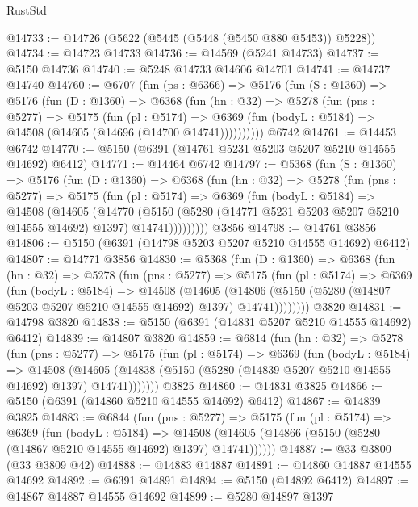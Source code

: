 \begin{lexlean}{RustStd}
\begin{coremodule}
@14733 := @14726 (@5622 (@5445 (@5448 (@5450 @880 @5453)) @5228))
@14734 := @14723 @14733
@14736 := @14569 (@5241 @14733)
@14737 := @5150 @14736
@14740 := @5248 @14733 @14606 @14701
@14741 := @14737 @14740
@14760 := @6707
    (fun (ps : @6366) =>
    @5176
      (fun (S : @1360) =>
      @5176
        (fun (D : @1360) =>
        @6368
          (fun (hn : @32) =>
          @5278
            (fun (pns : @5277) =>
            @5175
              (fun (pl : @5174) =>
              @6369 (fun (bodyL : @5184) => @14508 (@14605 (@14696 (@14700 @14741))))))))))
    @6742
@14761 := @14453 @6742
@14770 := @5150 (@6391 (@14761 @5231 @5203 @5207 @5210 @14555 @14692) @6412)
@14771 := @14464 @6742
@14797 := @5368
    (fun (S : @1360) =>
    @5176
      (fun (D : @1360) =>
      @6368
        (fun (hn : @32) =>
        @5278
          (fun (pns : @5277) =>
          @5175
            (fun (pl : @5174) =>
            @6369
              (fun (bodyL : @5184) =>
              @14508
                (@14605
                  (@14770
                    (@5150
                      (@5280 (@14771 @5231 @5203 @5207 @5210 @14555 @14692) @1397)
                      @14741)))))))))
    @3856
@14798 := @14761 @3856
@14806 := @5150 (@6391 (@14798 @5203 @5207 @5210 @14555 @14692) @6412)
@14807 := @14771 @3856
@14830 := @5368
    (fun (D : @1360) =>
    @6368
      (fun (hn : @32) =>
      @5278
        (fun (pns : @5277) =>
        @5175
          (fun (pl : @5174) =>
          @6369
            (fun (bodyL : @5184) =>
            @14508
              (@14605
                (@14806 (@5150 (@5280 (@14807 @5203 @5207 @5210 @14555 @14692) @1397) @14741))))))))
    @3820
@14831 := @14798 @3820
@14838 := @5150 (@6391 (@14831 @5207 @5210 @14555 @14692) @6412)
@14839 := @14807 @3820
@14859 := @6814
    (fun (hn : @32) =>
    @5278
      (fun (pns : @5277) =>
      @5175
        (fun (pl : @5174) =>
        @6369
          (fun (bodyL : @5184) =>
          @14508
            (@14605 (@14838 (@5150 (@5280 (@14839 @5207 @5210 @14555 @14692) @1397) @14741)))))))
    @3825
@14860 := @14831 @3825
@14866 := @5150 (@6391 (@14860 @5210 @14555 @14692) @6412)
@14867 := @14839 @3825
@14883 := @6844
    (fun (pns : @5277) =>
    @5175
      (fun (pl : @5174) =>
      @6369
        (fun (bodyL : @5184) =>
        @14508 (@14605 (@14866 (@5150 (@5280 (@14867 @5210 @14555 @14692) @1397) @14741))))))
@14887 := @33 @3800 (@33 @3809 @42)
@14888 := @14883 @14887
@14891 := @14860 @14887 @14555 @14692
@14892 := @6391 @14891
@14894 := @5150 (@14892 @6412)
@14897 := @14867 @14887 @14555 @14692
@14899 := @5280 @14897 @1397

\end{coremodule}
\end{lexlean}
